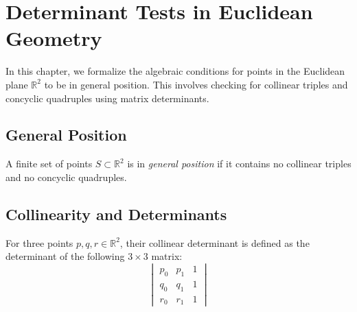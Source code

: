 %

\chapter{Determinant Tests in Euclidean Geometry}

In this chapter, we formalize the algebraic conditions for points in the Euclidean plane $\mathbb{R}^2$ to be in general position. This involves checking for collinear triples and concyclic quadruples using matrix determinants.

\section{General Position}

\begin{definition}
  \label{def:general_position}
  A finite set of points $S \subset \mathbb{R}^2$ is in \emph{general position} if it contains no collinear triples and no concyclic quadruples.
\end{definition}

\section{Collinearity and Determinants}

\begin{definition}
  \label{def:collinear_det}
  For three points $p, q, r \in \mathbb{R}^2$, their collinear determinant is defined as the determinant of the following $3 \times 3$ matrix:
  $$
  \begin{vmatrix}
    p_0 & p_1 & 1 \\
    q_0 & q_1 & 1 \\
    r_0 & r_1 & 1
  \end{vmatrix}
  $$
\end{definition}

